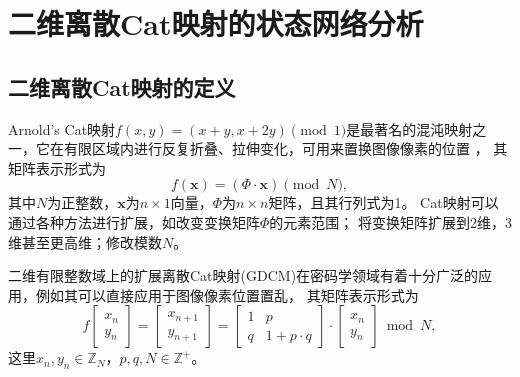 \chapter{二维离散Cat映射的状态网络分析}

\section{二维离散Cat映射的定义}

Arnold's Cat映射$f(x, y)=(x+y, x+2y)\pmod 1$是最著名的混沌映射之一，它在有限区域内进行反复折叠、拉伸变化，可用来置换图像像素的位置
\cite[Fig. 1.17]{arnol1968mathematical}，
其矩阵表示形式为
\begin{equation}
f(\textbf{x})=(\Phi \cdot \textbf{x})\pmod N,
\label{eq:ArnoldMatrix}
\end{equation}
其中$N$为正整数，$\textbf{x}$为$n\times 1$向量，$\Phi$为$n\times n$矩阵，且其行列式为1。
Cat映射可以通过各种方法进行扩展，如改变变换矩阵$\Phi$的元素范围；
将变换矩阵扩展到2维，3维甚至更高维；修改模数$N$。

二维有限整数域上的扩展离散Cat映射(GDCM)在密码学领域有着十分广泛的应用，例如其可以直接应用于图像像素位置置乱，
其矩阵表示形式为
\begin{equation}
f
\begin{bmatrix}
		x_{n} \\
		y_{n}
	\end{bmatrix}=
	\begin{bmatrix}
		x_{n+1} \\
		y_{n+1}
	\end{bmatrix}
	=
	\begin{bmatrix}
		1 & p    \\
		q & 1+p\cdot q
	\end{bmatrix}\cdot
	\begin{bmatrix}
		x_{n} \\
		y_{n}
	\end{bmatrix}
	\bmod N,
	\label{eq:ArnoldInteger}
\end{equation}
这里$x_n, y_n\in \mathbb{Z}_N$，$p, q, N\in \mathbb{Z}^+$。

